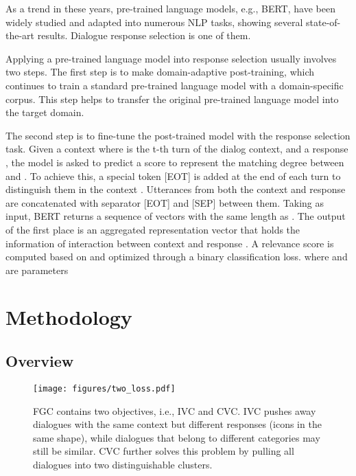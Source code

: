 \documentclass[letterpaper]{article} \usepackage{aaai22}  \usepackage{times}  \usepackage{helvet}  \usepackage{courier}  \usepackage[hyphens]{url}  \usepackage{graphicx} \urlstyle{rm} \def\UrlFont{\rm}  \usepackage{natbib}  \usepackage{caption} \DeclareCaptionStyle{ruled}{labelfont=normalfont,labelsep=colon,strut=off} \frenchspacing  \setlength{\pdfpagewidth}{8.5in}  \setlength{\pdfpageheight}{11in}  \usepackage{algorithm}
\begin{document}
As a trend in these years, pre-trained language models, e.g., BERT\cite{devlin2018bert}, have been widely studied and adapted into numerous NLP tasks, showing several state-of-the-art results. Dialogue response selection is one of them. 

Applying a pre-trained language model into response selection usually involves two steps. The first step is to make domain-adaptive post-training, which continues to train a standard pre-trained language model with a domain-specific corpus. This step helps to transfer the original pre-trained language model into the target domain. 

The second step is to fine-tune the post-trained model with the response selection task. Given a context  where  is the t-th turn of the dialog context, and a response , the model is asked to predict a score  to represent the matching degree between  and . To achieve this, a special token [EOT] is added at the end of each turn to distinguish them in the context . 
Utterances from both the context  and response  are concatenated with separator [EOT] and [SEP] between them.
Taking  as input, BERT returns a sequence of vectors with the same length as . The output of the first place  is an aggregated representation vector that holds the information of interaction between context  and response . A relevance score  is computed based on  and optimized through a binary classification loss. 
 where  and  are parameters 





\section{Methodology}

\subsection{Overview}

\begin{figure*}[htbp]
    \centering
    \texttt{[image: figures/two\_loss.pdf]}
    \caption{FGC contains two objectives, i.e., IVC and CVC. IVC pushes away dialogues with the same context but different responses (icons in the same shape), while dialogues that belong to different categories may still be similar. CVC further solves this problem by pulling all dialogues into two distinguishable clusters.}
    \label{fig:two_loss}
\end{figure*}
\end{document}
